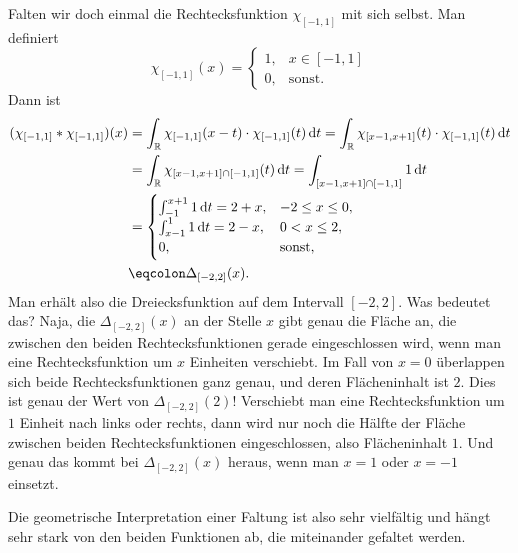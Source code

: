 \begin{example}[Faltung]
Falten wir doch einmal die Rechtecksfunktion $ \chi_{[-1,1]} $ mit sich selbst. Man definiert
\[
  \chi_{[-1,1]}(x) = \begin{cases} 1, & x \in [-1,1] \\ 0, & \text{sonst}. \end{cases}
\]
Dann ist
\begin{align*}
   (\chi_{[-1,1]} * \chi_{[-1,1]})(x) 
&= \int_{\R} \chi_{[-1,1]}(x - t) \cdot \chi_{[-1,1]}(t) \dif t
 = \int_{\R} \chi_{[x - 1, x + 1]}(t) \cdot \chi_{[-1,1]}(t) \dif t \\
&= \int_{\R} \chi_{[x - 1, x + 1] \cap [-1,1]}(t) \dif t
 = \int_{[x - 1, x + 1] \cap [-1,1]} 1 \dif t \\
&= \begin{cases}
      \int_{-1}^{x+1} 1 \dif t = 2 + x, & -2 \leq x \leq 0, \\
      \int_{x-1}^{1} 1 \dif t = 2 - x, & 0 < x \leq 2, \\
      0, & \text{sonst},
   \end{cases} \\
&\eqcolon \Delta_{[-2,2]}(x).
\end{align*}
Man erhält also die Dreiecksfunktion auf dem Intervall $ [-2,2] $. Was bedeutet das? Naja, die
$ \Delta_{[-2,2]}(x) $ an der Stelle $ x $ gibt genau die Fläche an, die zwischen den beiden 
Rechtecksfunktionen gerade eingeschlossen wird, wenn man eine Rechtecksfunktion um $ x $ Einheiten
verschiebt. Im Fall von $ x = 0 $ überlappen sich beide Rechtecksfunktionen ganz genau, und deren
Flächeninhalt ist $ 2 $. Dies ist genau der Wert von $ \Delta_{[-2,2]}(2) $! Verschiebt man eine
Rechtecksfunktion um $ 1 $ Einheit nach links oder rechts, dann wird nur noch die Hälfte der
Fläche zwischen beiden Rechtecksfunktionen eingeschlossen, also Flächeninhalt $ 1 $. Und genau das
kommt bei $ \Delta_{[-2,2]}(x) $ heraus, wenn man $ x = 1 $ oder $ x = -1 $ einsetzt.

Die geometrische Interpretation einer Faltung ist also sehr vielfältig und hängt sehr stark von den
beiden Funktionen ab, die miteinander gefaltet werden.
\end{example}


